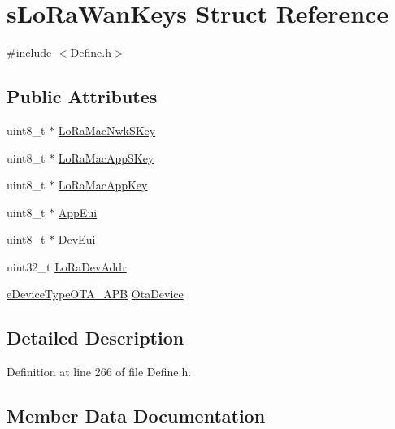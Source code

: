 \hypertarget{structs_lo_ra_wan_keys}{}\section{s\+Lo\+Ra\+Wan\+Keys Struct Reference}
\label{structs_lo_ra_wan_keys}


{\ttfamily \#include $<$Define.\+h$>$}

\subsection*{Public Attributes}
\begin{DoxyCompactItemize}
\item 
uint8\+\_\+t $\ast$ \mbox{\hyperlink{structs_lo_ra_wan_keys_a3fbacc8200a5720c10745f5eab5c4c7e}{Lo\+Ra\+Mac\+Nwk\+S\+Key}}
\item 
uint8\+\_\+t $\ast$ \mbox{\hyperlink{structs_lo_ra_wan_keys_ad6b6c043645eafba66603feca886fb23}{Lo\+Ra\+Mac\+App\+S\+Key}}
\item 
uint8\+\_\+t $\ast$ \mbox{\hyperlink{structs_lo_ra_wan_keys_af983e62161d0cef1452d553478e3a540}{Lo\+Ra\+Mac\+App\+Key}}
\item 
uint8\+\_\+t $\ast$ \mbox{\hyperlink{structs_lo_ra_wan_keys_a1f0a69278a218e8f1fde28e16c78b1b0}{App\+Eui}}
\item 
uint8\+\_\+t $\ast$ \mbox{\hyperlink{structs_lo_ra_wan_keys_a23f4c2f316fc8355c80f48151c4b6c83}{Dev\+Eui}}
\item 
uint32\+\_\+t \mbox{\hyperlink{structs_lo_ra_wan_keys_ad88facd7e11295d549ae4b2789d7d00f}{Lo\+Ra\+Dev\+Addr}}
\item 
\mbox{\hyperlink{_define_8h_a1e0a07faefc3dd68bbdd06f7c856cc74}{e\+Device\+Type\+O\+T\+A\+\_\+\+A\+PB}} \mbox{\hyperlink{structs_lo_ra_wan_keys_ac7acae00308fa51301a0b8e21cc1359e}{Ota\+Device}}
\end{DoxyCompactItemize}


\subsection{Detailed Description}


Definition at line 266 of file Define.\+h.



\subsection{Member Data Documentation}
\mbox{\label{structs_lo_ra_wan_keys_a1f0a69278a218e8f1fde28e16c78b1b0}} 
